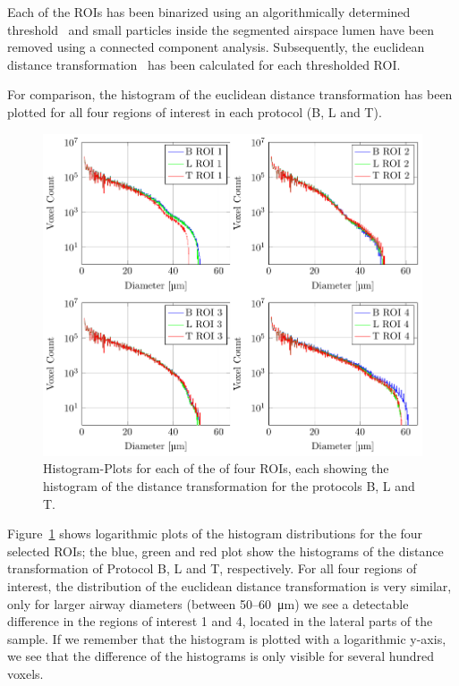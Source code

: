 Each of the ROIs has been binarized using an algorithmically determined threshold~\cite{Otsu1979} and small particles inside the segmented airspace lumen have been removed using a connected component analysis. Subsequently, the euclidean distance transformation~\cite{Danielsson1980} has been calculated for each thresholded ROI.

For comparison, the histogram of the euclidean distance transformation has been plotted for all four regions of interest in each protocol (B, L and T).

\begin{figure}[htb]
	\centering
	\includegraphics[width=\linewidth]{img/Haberthuer2010/Fig09-DTF}
	\caption[Histogram-Plots]{Histogram-Plots for each of the of four ROIs, each showing the histogram of the distance transformation for the protocols B, L and T.}%
	\label{fig:DTFplots}
\end{figure}

Figure~\ref{fig:DTFplots} shows logarithmic plots of the histogram distributions for the four selected ROIs; the blue, green and red plot show the histograms of the distance transformation of Protocol B, L and T, respectively. For all four regions of interest, the distribution of the euclidean distance transformation is very similar, only for larger airway diameters (between 50--\SI{60}{\micro\meter}) we see a detectable difference in the regions of interest 1 and 4, located in the lateral parts of the sample. If we remember that the histogram is plotted with a logarithmic y-axis, we see that the difference of the histograms is only visible for several hundred voxels.

